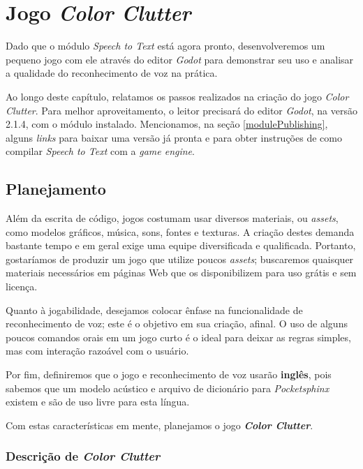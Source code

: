 \chapter{Jogo \textit{Color Clutter}}
\label{cap:color-clutter}

Dado que o módulo \textit{Speech to Text} está agora pronto, desenvolveremos um pequeno jogo com ele através do editor \textit{Godot} para demonstrar seu uso e analisar a qualidade do reconhecimento de voz na prática.

Ao longo deste capítulo, relatamos os passos realizados na criação do jogo \textit{Color Clutter}. Para melhor aproveitamento, o leitor precisará do editor \textit{Godot}, na versão 2.1.4, com o módulo instalado. Mencionamos, na seção \ref{modulePublishing}, alguns \textit{links} para baixar uma versão já pronta e para obter instruções de como compilar \textit{Speech to Text} com a \textit{game engine}.


\section{Planejamento}

Além da escrita de código, jogos costumam usar diversos materiais, ou \emph{assets}, como modelos gráficos, música, sons, fontes e texturas. A criação destes demanda bastante tempo e em geral exige uma equipe diversificada e qualificada. Portanto, gostaríamos de produzir um jogo que utilize poucos \textit{assets}; buscaremos quaisquer materiais necessários em páginas Web que os disponibilizem para uso grátis e sem licença.

Quanto à jogabilidade, desejamos colocar ênfase na funcionalidade de reconhecimento de voz; este é o objetivo em sua criação, afinal. O uso de alguns poucos comandos orais em um jogo curto é o ideal para deixar as regras simples, mas com interação razoável com o usuário.

Por fim, definiremos que o jogo e reconhecimento de voz usarão \textbf{inglês}, pois sabemos que um modelo acústico e arquivo de dicionário para \textit{Pocketsphinx} existem e são de uso livre para esta língua.

Com estas características em mente, planejamos o jogo \textbf{\emph{Color Clutter}}.


\subsection{Descrição de \textit{Color Clutter}}

